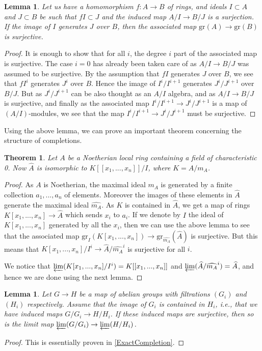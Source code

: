 \documentclass[12pt,a4paper,leqno]{article}
\newcommand{\gr}{\mathrm{gr}}
\newcommand{\plim}{\varprojlim}
\newcommand{\fref}[1]{\hyperref[{#1}]{\ref*{#1}}}
\theoremstyle{plain}
\newtheorem{thm}[theo]{Theorem}
\newtheorem{lem}[theo]{Lemma}
\theoremstyle{definition}
\theoremstyle{remark}
\begin{document}
\begin{lem}
Let us have a homomorphism $f: A \to B$ of rings, and ideals $I \subset A$ and $J \subset B$ be such that $fI \subset J$ and the induced map $A / I \to B / J$ is a surjection. If the image of $I$ generates $J$ over $B$, then the associated map $\gr (A) \to \gr (B)$ is surjective.
\end{lem}
\begin{proof}
It is enough to show that for all $i$, the degree $i$ part of the associated map is surjective. The case $i=0$ has already been taken care of as $A/I \to B/J$ was assumed to be surjective. By the assumption that $f I$ generates $J$ over $B$, we see that $f I^i$ generates $J^i$ over $B$. Hence the image of $I^i / I^{i+1}$ generates $J^i / J^{i+1}$ over $B/J$. But as $J^i / J^{i+1}$ can be also thought as an $A/I$ algebra, and as $A/I \to B/J$ is surjective, and finally as the associated map $I^i / I^{i+1} \to J^i / J^{i+1}$ is a map of $(A/I)$-modules, we see that the map $I^i / I^{i+1} \to J^i / J^{i+1}$ must be surjective.
\end{proof}

Using the above lemma, we can prove an important theorem concerning the structure of completions.

\begin{thm}
Let $A$ be a Noetherian local ring containing a field of characteristic 0. Now $\widehat A$ is isomorphic to $K[[x_1,...,x_n]]/I$, where $K = A/m_A$.
\end{thm}
\begin{proof}
As $A$ is Noetherian, the maximal ideal $m_A$ is generated by a finite collection $a_1,...,a_n$ of elements. Moreover the images of these elements in $\widehat A$ generate the maximal ideal $\widehat{m_A}$. As $K$ is contained in $\widehat A$, we get a map of rings $K[x_1,...,x_n] \to \widehat{A}$ which sends $x_i$ to $a_i$. If we denote by $I$ the ideal of $K[x_1,...,x_n]$ generated by all the $x_i$, then we can use the above lemma to see that the associated map $\gr_I(K[x_1,...,x_n]) \to \gr_{\widehat{m_A}}(\widehat{A})$ is surjective. But this means that $K[x_1,...,x_n] / I^i \to \widehat{A} / \widehat{m_A}^i$ is surjective for all $i$. 

We notice that $\plim (K[x_1,...,x_n] / I^i) = K[[x_1,...,x_n]]$ and $\plim (\widehat{A} / \widehat{m_A}^i) = \widehat A$, and hence we are done using the next lemma.
\end{proof}

\begin{lem}
Let $G \to H$ be a map of abelian groups with filtrations $(G_i)$ and $(H_i)$ respectively. Assume that the image of $G_i$ is contained in $H_i$, i.e., that we have induced maps $G / G_i \to H / H_i$. If these induced maps are surjective, then so is the limit map $\plim (G/G_i) \to \plim (H / H_i)$.
\end{lem}
\begin{proof}
This is essentially proven in \fref{ExactCompletion}.
\end{proof}
\end{document}
